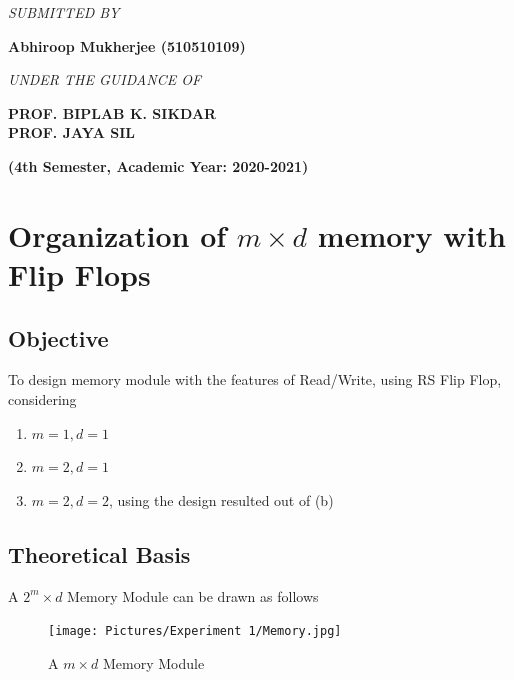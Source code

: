 \documentclass[a4paper]{article}
\begin{document}
\begin{titlepage}
\begin{center}
        \textit{SUBMITTED BY}\\[0.3cm]
        \begin{large}
            \textbf{Abhiroop Mukherjee (510510109)}\\[1cm]
        \end{large}
        
        \textit{UNDER THE GUIDANCE OF}\\[0.3cm]
        \begin{large}
            \textbf{PROF. BIPLAB K. SIKDAR}\\[0.3cm]
            \textbf{PROF. JAYA SIL}\\[1cm]
        \end{large}
        
        \textbf{(4th Semester, Academic Year: 2020-2021)}
    \end{center}
\end{titlepage}

\pagebreak

\setcounter{page}{1}
\setcounter{tocdepth}{1} %
\tableofcontents
\newpage

\setcounter{page}{1}



\section{Organization of $m\times d$ memory with Flip Flops}
\subsection{Objective}
To design memory module with the features of Read/Write, using RS Flip Flop, considering
\begin{enumerate}[label=(\alph*)]
    \item $m=1, d=1$
    \item $m=2, d=1$
    \item $m=2, d=2$, using the design resulted out of (b)
\end{enumerate}

\subsection{Theoretical Basis}
A $2^m\times d$ Memory Module can be drawn as follows
\begin{figure}[h!]
    \centering
    \texttt{[image: Pictures/Experiment 1/Memory.jpg]}
    \caption{A $m\times d$ Memory Module}
    \label{fig:MemModmd}
\end{figure}
\end{document}
